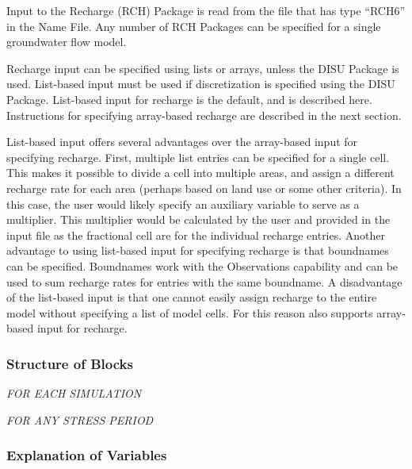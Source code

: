 
Input to the Recharge (RCH) Package is read from the file that has type ``RCH6'' in the Name File.  Any number of RCH Packages can be specified for a single groundwater flow model.

Recharge input can be specified using lists or arrays, unless the DISU Package is used.  List-based input must be used if discretization is specified using the DISU Package.  List-based input for recharge is the default, and is described here.  Instructions for specifying array-based recharge are described in the next section. 

List-based input offers several advantages over the array-based input for specifying recharge.  First, multiple list entries can be specified for a single cell.  This makes it possible to divide a cell into multiple areas, and assign a different recharge rate for each area (perhaps based on land use or some other criteria).  In this case, the user would likely specify an auxiliary variable to serve as a multiplier.  This multiplier would be calculated by the user and provided in the input file as the fractional cell are for the individual recharge entries.  Another advantage to using list-based input for specifying recharge is that boundnames can be specified.  Boundnames work with the Observations capability and can be used to sum recharge rates for entries with the same boundname.  A disadvantage of the list-based input is that one cannot easily assign recharge to the entire model without specifying a list of model cells.  For this reason \mf also supports array-based input for recharge.

\vspace{5mm}
\subsubsection{Structure of Blocks}
\vspace{5mm}

\noindent \textit{FOR EACH SIMULATION}


\vspace{5mm}
\noindent \textit{FOR ANY STRESS PERIOD}

\packageperioddescription

\vspace{5mm}
\subsubsection{Explanation of Variables}
\begin{description}

\end{description}

